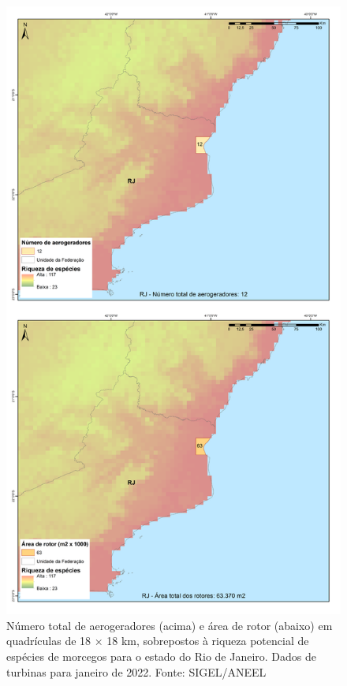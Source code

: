 \documentclass[
  oneside]{scrbook}
\begin{document}
\begin{figure}[H]

{\centering \includegraphics[width=0.7\linewidth]{imagens/cap09/Figura_9.14} 

}

\caption{Número total de aerogeradores (acima) e área de rotor (abaixo) em quadrículas de 18 × 18 km, sobrepostos à riqueza potencial de espécies de morcegos para o estado do Rio de Janeiro. Dados de turbinas para janeiro de 2022. Fonte: SIGEL/ANEEL}\label{fig:79}
\end{figure}
\end{document}
